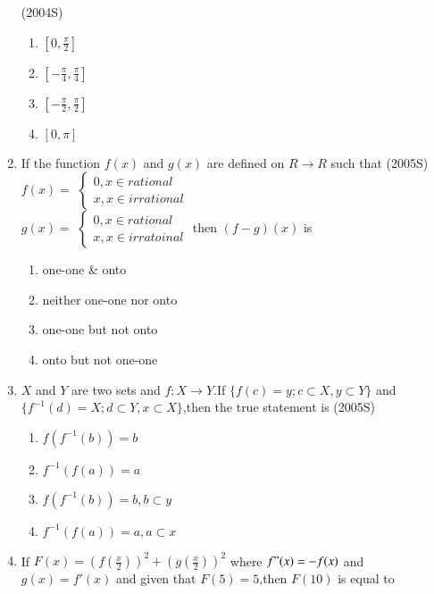 \documentclass[journal,12pt,twocolumn]{IEEEtran}
\theoremstyle{remark}
\begin{document}
\begin{enumerate}
\hfill(2004S)\\
\begin{multicols}{2}
\begin{enumerate}
    \item $\left[0,\frac{\pi}{2}\right]$\\
    \item $\left[-\frac{\pi}{4},\frac{\pi}{4}\right]$\\
    \item $\left[-\frac{\pi}{2},\frac{\pi}{2}\right]$\\
    \item $[0,\pi]$
\end{enumerate}
\end{multicols}
\item If the function $f(x)$ and $g(x)$ are defined on $R \rightarrow R $ such that
\hfill(2005S)
\\$f(x)=$
$ \begin{cases}
    0, x \in rational\\
    x, x \in irrational 
\end{cases} $ \\
    $g(x)=$
$\begin{cases}
    0,x \in rational\\
    x,x \in irratoinal
\end{cases}$
then $(f-g)(x)$ is 
\begin{enumerate}
    \item one-one \& onto 
    \item neither one-one nor onto
    \item one-one but not onto 
    \item onto but not one-one
\end{enumerate}
\item $X$ and $Y$ are two sets and $f:X\rightarrow Y$.If $ \{f(c)=y;c \subset X,y \subset Y\} $ and $ \{f^{-1}(d)=X;d \subset Y,x \subset X \} $,then the true statement is 
\hfill(2005S)\\
\begin{multicols}{2}
\begin{enumerate}
    \item $f(f^{-1}(b))=b$
    \item $f^{-1}(f(a))=a$
    \item $f(f^{-1}(b))=b,b \subset y$
    \item $f^{-1}(f(a))=a,a \subset x$
\end{enumerate}
\end{multicols}
\item If $F(x)=\left( f\left( \frac{x}{2}\right) \right)^2 + \left(g\left (\frac{x}{2}\right) \right)^2$ where $f"(x)=-f(x)$ and $ g(x)=f'(x)$ and given that $F(5)=5$,then $F(10)$ is equal to 

\end{enumerate}
\end{document}
